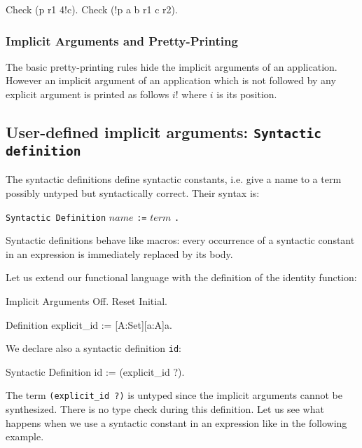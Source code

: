 \Example

\begin{coq_example}
Check (p r1 4!c).
Check (!p a b r1 c r2).
\end{coq_example}

\subsubsection{Implicit Arguments and Pretty-Printing}

The basic pretty-printing rules hide the implicit arguments of an
application. However an implicit argument {\term} of an application
which is not followed by any explicit argument is printed as follows
$i!${\term} where $i$ is its position.

\subsection{User-defined implicit arguments: {\tt Syntactic definition}}
\label{Syntactic-Definition}

The syntactic definitions define syntactic constants, i.e. give a name
to a term possibly untyped but syntactically correct. Their syntax
is:

\begin{center}
\verb+Syntactic Definition+ $name$ \verb+:=+ $term$ \verb+.+ \\
\end{center}

Syntactic definitions behave like macros: every occurrence of a
syntactic constant in an expression is immediately replaced by its
body.

Let us extend our functional language with the definition of the
identity function:

\begin{coq_eval}
Implicit Arguments Off.
Reset Initial.
\end{coq_eval}
\begin{coq_example}
Definition explicit_id := [A:Set][a:A]a.
\end{coq_example}

We declare also a syntactic definition {\tt id}:

\begin{coq_example}
Syntactic Definition id := (explicit_id ?).
\end{coq_example}

The term {\tt (explicit\_id ?)} is untyped since the implicit
arguments cannot be synthesized. There is no type check during this
definition.  Let us see what happens when we use a syntactic constant
in an expression like in the following example.

